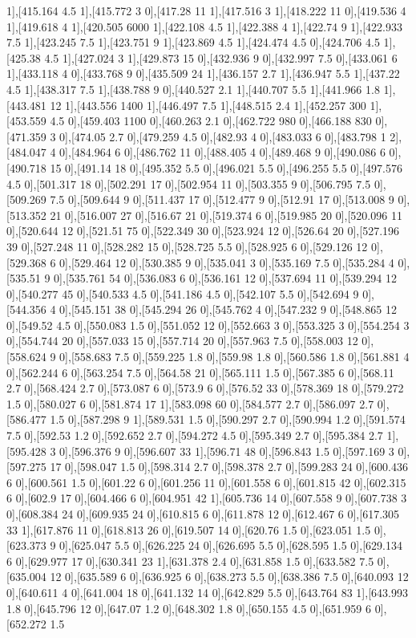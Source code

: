 {1],[415.164 4.5 1],[415.772 3 0],[417.28 11 1],[417.516 3 1],[418.222 11 0],[419.536 4 1],[419.618 4 1],[420.505 6000 1],[422.108 4.5 1],[422.388 4 1],[422.74 9 1],[422.933 7.5 1],[423.245 7.5 1],[423.751 9 1],[423.869 4.5 1],[424.474 4.5 0],[424.706 4.5 1],[425.38 4.5 1],[427.024 3 1],[429.873 15 0],[432.936 9 0],[432.997 7.5 0],[433.061 6 1],[433.118 4 0],[433.768 9 0],[435.509 24 1],[436.157 2.7 1],[436.947 5.5 1],[437.22 4.5 1],[438.317 7.5 1],[438.788 9 0],[440.527 2.1 1],[440.707 5.5 1],[441.966 1.8 1],[443.481 12 1],[443.556 1400 1],[446.497 7.5 1],[448.515 2.4 1],[452.257 300 1],[453.559 4.5 0],[459.403 1100 0],[460.263 2.1 0],[462.722 980 0],[466.188 830 0],[471.359 3 0],[474.05 2.7 0],[479.259 4.5 0],[482.93 4 0],[483.033 6 0],[483.798 1 2],[484.047 4 0],[484.964 6 0],[486.762 11 0],[488.405 4 0],[489.468 9 0],[490.086 6 0],[490.718 15 0],[491.14 18 0],[495.352 5.5 0],[496.021 5.5 0],[496.255 5.5 0],[497.576 4.5 0],[501.317 18 0],[502.291 17 0],[502.954 11 0],[503.355 9 0],[506.795 7.5 0],[509.269 7.5 0],[509.644 9 0],[511.437 17 0],[512.477 9 0],[512.91 17 0],[513.008 9 0],[513.352 21 0],[516.007 27 0],[516.67 21 0],[519.374 6 0],[519.985 20 0],[520.096 11 0],[520.644 12 0],[521.51 75 0],[522.349 30 0],[523.924 12 0],[526.64 20 0],[527.196 39 0],[527.248 11 0],[528.282 15 0],[528.725 5.5 0],[528.925 6 0],[529.126 12 0],[529.368 6 0],[529.464 12 0],[530.385 9 0],[535.041 3 0],[535.169 7.5 0],[535.284 4 0],[535.51 9 0],[535.761 54 0],[536.083 6 0],[536.161 12 0],[537.694 11 0],[539.294 12 0],[540.277 45 0],[540.533 4.5 0],[541.186 4.5 0],[542.107 5.5 0],[542.694 9 0],[544.356 4 0],[545.151 38 0],[545.294 26 0],[545.762 4 0],[547.232 9 0],[548.865 12 0],[549.52 4.5 0],[550.083 1.5 0],[551.052 12 0],[552.663 3 0],[553.325 3 0],[554.254 3 0],[554.744 20 0],[557.033 15 0],[557.714 20 0],[557.963 7.5 0],[558.003 12 0],[558.624 9 0],[558.683 7.5 0],[559.225 1.8 0],[559.98 1.8 0],[560.586 1.8 0],[561.881 4 0],[562.244 6 0],[563.254 7.5 0],[564.58 21 0],[565.111 1.5 0],[567.385 6 0],[568.11 2.7 0],[568.424 2.7 0],[573.087 6 0],[573.9 6 0],[576.52 33 0],[578.369 18 0],[579.272 1.5 0],[580.027 6 0],[581.874 17 1],[583.098 60 0],[584.577 2.7 0],[586.097 2.7 0],[586.477 1.5 0],[587.298 9 1],[589.531 1.5 0],[590.297 2.7 0],[590.994 1.2 0],[591.574 7.5 0],[592.53 1.2 0],[592.652 2.7 0],[594.272 4.5 0],[595.349 2.7 0],[595.384 2.7 1],[595.428 3 0],[596.376 9 0],[596.607 33 1],[596.71 48 0],[596.843 1.5 0],[597.169 3 0],[597.275 17 0],[598.047 1.5 0],[598.314 2.7 0],[598.378 2.7 0],[599.283 24 0],[600.436 6 0],[600.561 1.5 0],[601.22 6 0],[601.256 11 0],[601.558 6 0],[601.815 42 0],[602.315 6 0],[602.9 17 0],[604.466 6 0],[604.951 42 1],[605.736 14 0],[607.558 9 0],[607.738 3 0],[608.384 24 0],[609.935 24 0],[610.815 6 0],[611.878 12 0],[612.467 6 0],[617.305 33 1],[617.876 11 0],[618.813 26 0],[619.507 14 0],[620.76 1.5 0],[623.051 1.5 0],[623.373 9 0],[625.047 5.5 0],[626.225 24 0],[626.695 5.5 0],[628.595 1.5 0],[629.134 6 0],[629.977 17 0],[630.341 23 1],[631.378 2.4 0],[631.858 1.5 0],[633.582 7.5 0],[635.004 12 0],[635.589 6 0],[636.925 6 0],[638.273 5.5 0],[638.386 7.5 0],[640.093 12 0],[640.611 4 0],[641.004 18 0],[641.132 14 0],[642.829 5.5 0],[643.764 83 1],[643.993 1.8 0],[645.796 12 0],[647.07 1.2 0],[648.302 1.8 0],[650.155 4.5 0],[651.959 6 0],[652.272 1.5 }
